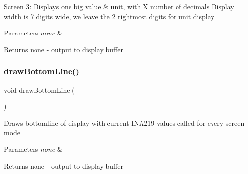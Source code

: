 Screen 3\+: Displays one big value \& unit, with X number of decimals Display width is 7 digits wide, we leave the 2 rightmost digits for unit display


\begin{DoxyParams}{Parameters}
{\em none} & \\
\hline
\end{DoxyParams}
\begin{DoxyReturn}{Returns}
none -\/ output to display buffer 
\end{DoxyReturn}
\hypertarget{_u_s_b___tester___o_l_e_d__128x64___beta__2_82_8ino_ab5d455e2661c48053af78b45d7eb902e}{}\label{_u_s_b___tester___o_l_e_d__128x64___beta__2_82_8ino_ab5d455e2661c48053af78b45d7eb902e} 
\subsubsection{\texorpdfstring{draw\+Bottom\+Line()}{drawBottomLine()}}
{\footnotesize\ttfamily void draw\+Bottom\+Line (\begin{DoxyParamCaption}{ }\end{DoxyParamCaption})}

Draws bottomline of display with current I\+N\+A219 values called for every screen mode


\begin{DoxyParams}{Parameters}
{\em none} & \\
\hline
\end{DoxyParams}
\begin{DoxyReturn}{Returns}
none -\/ output to display buffer 
\end{DoxyReturn}
\hypertarget{_u_s_b___tester___o_l_e_d__128x64___beta__2_82_8ino_ace2fc5703ebe53f1c62d8b9b208b7ca7}{}\label{_u_s_b___tester___o_l_e_d__128x64___beta__2_82_8ino_ace2fc5703ebe53f1c62d8b9b208b7ca7} 

